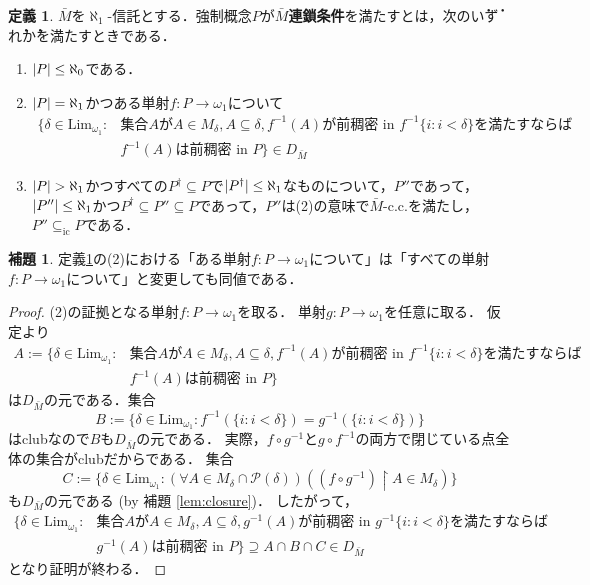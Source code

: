\documentclass[uplatex]{jsarticle}
\newcommand{\Pow}{\mathcal{P}}
\newcommand{\restrict}{\upharpoonright}
\newcommand{\Limone}{\mathrm{Lim}_{\omega_1}}
\newcommand{\subsetic}{\subseteq_{\mathrm{ic}}}
\DeclarePairedDelimiter\abs{\lvert}{\rvert}
\renewcommand\subset{\subseteq}
\theoremstyle{definition}
\newtheorem{defi}[thm]{定義}
\newtheorem{lem}[thm]{補題}
\begin{document}
	\begin{defi}\label{def:oraclecc}
		$\bar{M}$を$\aleph_1$-信託とする．強制概念$P$が\textbf{$\bar{M}$連鎖条件}を満たすとは，次の\.い\.ず\.れ\.かを満たすときである．
		\begin{enumerate}
			\item $\abs{P} \le \aleph_0$である．
			\item $\abs{P} = \aleph_1$かつある単射$f \colon P \to \omega_1$について
			\begin{align*}
			\{ \delta \in \Limone : &\text{集合}A\text{が}A \in M_\delta, A \subset \delta, \text{$f^{-1}(A)$が前稠密 in $f^{-1}\{i : i < \delta\}$を満たすならば} \\
			&\text{$f^{-1}(A)$は前稠密 in $P$} \} \in D_{\bar{M}}
			\end{align*}
			\item $\abs{P} > \aleph_1$かつすべての$P^\dagger \subset P$で$\abs{P^\dagger} \le \aleph_1$なものについて，$P''$であって，$\abs{P''} \le \aleph_1$かつ$P^\dagger \subset P'' \subset P$であって，$P''$は(2)の意味で$\bar{M}$-c.c.を満たし，$P'' \subsetic P$である．
		\end{enumerate}
	\end{defi}

	\begin{lem}
		定義\ref{def:oraclecc}の(2)における「ある単射$f \colon P \to \omega_1$について」は「すべての単射$f \colon P \to \omega_1$について」と変更しても同値である．
	\end{lem}
	\begin{proof}
		(2)の証拠となる単射$f \colon P \to \omega_1$を取る．
		単射$g \colon P \to \omega_1$を任意に取る．
		仮定より
		\begin{align*}
		A := \{ \delta \in \Limone : &\text{集合}A\text{が}A \in M_\delta, A \subset \delta, \text{$f^{-1}(A)$が前稠密 in $f^{-1}\{i : i < \delta\}$を満たすならば} \\
		&\text{$f^{-1}(A)$は前稠密 in $P$} \}
		\end{align*}
		は$D_{\bar{M}}$の元である．集合
		\[
		B := \{ \delta \in \Limone : f^{-1}(\{i : i < \delta\}) = g^{-1}(\{i : i < \delta\})\}
		\]
		はclubなので$B$も$D_{\bar{M}}$の元である．
		実際，$f \circ g^{-1}$と$g \circ f^{-1}$の両方で閉じている点全体の集合がclubだからである．
		集合
		\[
		C := \{ \delta \in \Limone : (\forall A \in M_\delta \cap \Pow(\delta)) ((f \circ g^{-1}) \restrict A \in M_\delta) \}
		\]
		も$D_{\bar{M}}$の元である (by 補題 \ref{lem:closure})．
		したがって，
		\begin{align*}
			\{ \delta \in \Limone : &\text{集合}A\text{が}A \in M_\delta, A \subset \delta, \text{$g^{-1}(A)$が前稠密 in $g^{-1}\{i : i < \delta\}$を満たすならば} \\
			&\text{$g^{-1}(A)$は前稠密 in $P$} \} \supseteq A \cap B \cap C \in D_{\bar{M}}
		\end{align*}
		となり証明が終わる．
	\end{proof}
\end{document}
